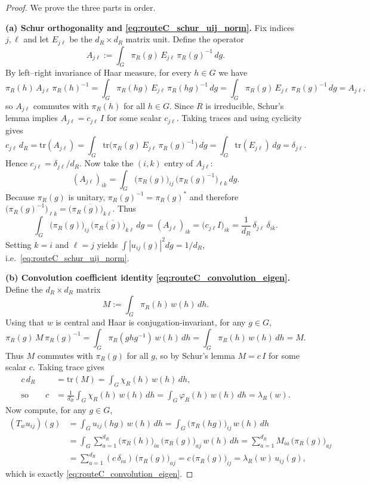 \begin{proof}
We prove the three parts in order.

\medskip
\noindent\textbf{(a) Schur orthogonality and \eqref{eq:routeC_schur_uij_norm}.}
Fix indices $j,\ell$ and let $E_{j\ell}$ be the $d_R\times d_R$ matrix unit.
Define the operator
\[
A_{j\ell}:=\int_G \pi_R(g)\,E_{j\ell}\,\pi_R(g)^{-1}\,dg.
\]
By left--right invariance of Haar measure, for every $h\in G$ we have
\[
\pi_R(h)\,A_{j\ell}\,\pi_R(h)^{-1}
=\int_G \pi_R(hg)\,E_{j\ell}\,\pi_R(hg)^{-1}\,dg
=\int_G \pi_R(g)\,E_{j\ell}\,\pi_R(g)^{-1}\,dg
=A_{j\ell},
\]
so $A_{j\ell}$ commutes with $\pi_R(h)$ for all $h\in G$.
Since $R$ is irreducible, Schur's lemma implies $A_{j\ell}=c_{j\ell}\,I$ for some scalar $c_{j\ell}$.
Taking traces and using cyclicity gives
\[
c_{j\ell}\,d_R=\mathrm{tr}(A_{j\ell})
=\int_G \mathrm{tr}\!\bigl(\pi_R(g)\,E_{j\ell}\,\pi_R(g)^{-1}\bigr)\,dg
=\int_G \mathrm{tr}(E_{j\ell})\,dg
=\delta_{j\ell}.
\]
Hence $c_{j\ell}=\delta_{j\ell}/d_R$.
Now take the $(i,k)$ entry of $A_{j\ell}$:
\[
(A_{j\ell})_{ik}
=\int_G \bigl(\pi_R(g)\bigr)_{ij}\,\bigl(\pi_R(g)^{-1}\bigr)_{\ell k}\,dg.
\]
Because $\pi_R(g)$ is unitary, $\pi_R(g)^{-1}=\pi_R(g)^{\ast}$ and therefore
$\bigl(\pi_R(g)^{-1}\bigr)_{\ell k}=\overline{\bigl(\pi_R(g)\bigr)_{k\ell}}$.
Thus
\[
\int_G \bigl(\pi_R(g)\bigr)_{ij}\,\overline{\bigl(\pi_R(g)\bigr)_{k\ell}}\,dg
=(A_{j\ell})_{ik}
=\bigl(c_{j\ell}I\bigr)_{ik}
=\frac{1}{d_R}\,\delta_{j\ell}\,\delta_{ik}.
\]
Setting $k=i$ and $\ell=j$ yields $\int |u_{ij}(g)|^2dg=1/d_R$, i.e.\ \eqref{eq:routeC_schur_uij_norm}.

\medskip
\noindent\textbf{(b) Convolution coefficient identity \eqref{eq:routeC_convolution_eigen}.}
Define the $d_R\times d_R$ matrix
\[
M:=\int_G \pi_R(h)\,w(h)\,dh.
\]
Using that $w$ is central and Haar is conjugation-invariant, for any $g\in G$,
\[
\pi_R(g)\,M\,\pi_R(g)^{-1}
=\int_G \pi_R(ghg^{-1})\,w(h)\,dh
=\int_G \pi_R(h)\,w(h)\,dh
=M.
\]
Thus $M$ commutes with $\pi_R(g)$ for all $g$, so by Schur's lemma $M=c\,I$ for some scalar $c$.
Taking trace gives
\[
\begin{aligned}
c\,d_R&=\mathrm{tr}(M)=\int_G \chi_R(h)\,w(h)\,dh,\\
\text{so}\qquad
c&=\frac{1}{d_R}\int_G \chi_R(h)\,w(h)\,dh
=\int_G \varphi_R(h)\,w(h)\,dh
=\lambda_R(w).
\end{aligned}
\]
Now compute, for any $g\in G$,
\begin{align*}
(T_w u_{ij})(g)
&=\int_G u_{ij}(hg)\,w(h)\,dh
=\int_G \bigl(\pi_R(hg)\bigr)_{ij}\,w(h)\,dh
\\
&=\int_G \sum_{a=1}^{d_R}\bigl(\pi_R(h)\bigr)_{ia}\,\bigl(\pi_R(g)\bigr)_{aj}\,w(h)\,dh
=\sum_{a=1}^{d_R} M_{ia}\,\bigl(\pi_R(g)\bigr)_{aj}
\\
&=\sum_{a=1}^{d_R} (c\,\delta_{ia})\,\bigl(\pi_R(g)\bigr)_{aj}
=c\,\bigl(\pi_R(g)\bigr)_{ij}
=\lambda_R(w)\,u_{ij}(g),
\end{align*}
which is exactly \eqref{eq:routeC_convolution_eigen}.


\end{proof}
